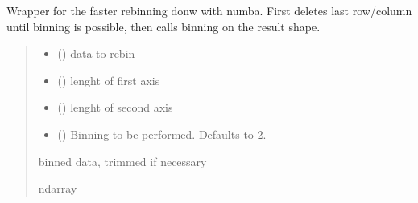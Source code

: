 \documentclass[letterpaper,10pt,english]{sphinxmanual}
\begin{document}

\begin{fulllineitems}
\label{\detokenize{micropolarray.processing:micropolarray.processing.rebin.micropolarray_rebin}}
\pysigstartsignatures
{}
\pysigstopsignatures
\sphinxAtStartPar
Wrapper for the faster rebinning donw with numba. First deletes last row/column until binning is possible, then calls binning on the result shape.
\begin{quote}\begin{description}
\begin{itemize}
\item {} 
\sphinxAtStartPar
{} () \textendash{} data to rebin

\item {} 
\sphinxAtStartPar
{} () \textendash{} lenght of first axis

\item {} 
\sphinxAtStartPar
{} () \textendash{} lenght of second axis

\item {} 
\sphinxAtStartPar
{} (\sphinxstyleliteralemphasis{\sphinxupquote{, }}) \textendash{} Binning to be performed. Defaults to 2.

\end{itemize}

\sphinxAtStartPar
binned data, trimmed if necessary

\sphinxAtStartPar
ndarray

\end{description}\end{quote}

\end{fulllineitems}
\end{document}
